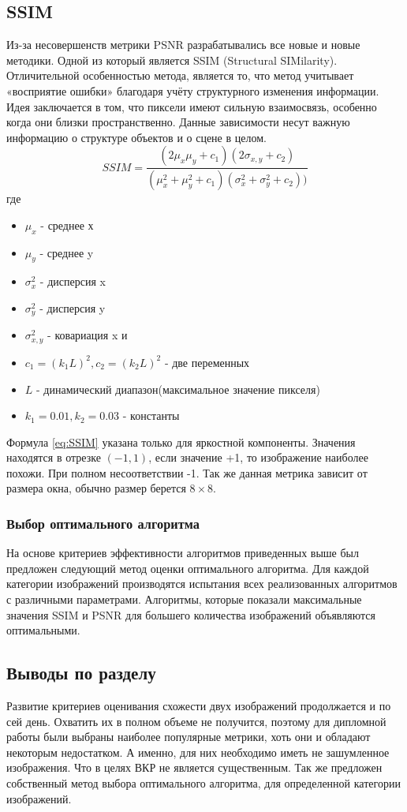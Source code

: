 \subsection{SSIM}
Из-за несовершенств метрики PSNR разрабатывались все новые и новые методики. Одной из который является SSIM (Structural SIMilarity). Отличительной особенностью метода, является то, что метод учитывает «восприятие ошибки» благодаря учёту структурного изменения информации. Идея заключается в том, что пиксели имеют сильную взаимосвязь, особенно когда они близки пространственно. Данные зависимости несут важную информацию о структуре объектов и о сцене в целом\cite{ssim}.
\begin{equation}\label{eq:SSIM}
SSIM = \frac{(2\mu_x\mu_y+c_1)(2\sigma_{x,y}+c_2)}{(\mu_x^2+\mu_y^2+c_1)(\sigma_x^2+\sigma_y^2+c_2))}
\end{equation}
где
\begin{itemize}
	\item $\mu_x$ - среднее х
	\item $\mu_y$ - среднее y
	\item $\sigma_x^2$ - дисперсия x
	\item $\sigma_y^2$ - дисперсия y
	\item $\sigma_{x,y}^2$ - ковариация x и \item $c_1=(k_1L)^2, c_2=(k_2L)^2$ - две переменных
	\item $L$ - динамический диапазон(максимальное значение пикселя)  
	\item $k_1=0.01, k_2=0.03$ - константы
\end{itemize}
Формула \ref{eq:SSIM} указана только для яркостной компоненты. Значения находятся в отрезке $(-1,1)$, если значение +1, то изображение наиболее похожи. При полном несоответствии -1. Так же данная метрика зависит от размера окна, обычно размер берется $8\times8$.\

\subsubsection{Выбор оптимального алгоритма}
На основе критериев эффективности алгоритмов приведенных выше был предложен следующий метод оценки оптимального алгоритма. Для каждой категории изображений производятся испытания всех реализованных алгоритмов с различными параметрами. Алгоритмы, которые показали максимальные значения SSIM и PSNR для большего количества изображений объявляются оптимальными.

\subsection{Выводы по разделу}
Развитие критериев оценивания схожести двух изображений продолжается и по сей день. Охватить их в полном объеме не получится, поэтому для дипломной работы были выбраны наиболее популярные метрики, хоть они и обладают некоторым недостатком. А именно, для них необходимо иметь не зашумленное изображения. Что в целях ВКР не является существенным.
Так же предложен собственный метод выбора оптимального алгоритма, для определенной категории изображений.